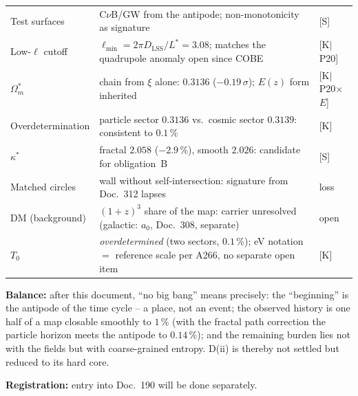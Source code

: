 \documentclass[11pt]{report}
\begin{document}
{\begin{longtable}{lp{6.4cm}l}
Test surfaces & C$\nu$B/GW from the antipode; non-monotonicity as
  signature & [S] \\
Low-$\ell$ cutoff & $\ell_\text{min} = 2\pi D_\text{LSS}/L^{*} =
  3.08$; matches the quadrupole anomaly open since COBE
  & [K$|$P20] \\
$\Omega_m^{*}$ & chain from $\xi$ alone: $0.3136$
  ($-0.19\,\sigma$); $E(z)$ form inherited & [K$|$P20$\times$$E$] \\
Overdetermination & particle sector $0.3136$ vs.\ cosmic sector
  $0.3139$: consistent to $0.1\,\%$ & [K] \\
$\kappa^{*}$ & fractal $2.058$ ($-2.9\,\%$), smooth $2.026$:
  candidate for obligation~B & [S] \\
Matched circles & wall without self-intersection: signature from
  Doc.~312 lapses & loss \\
DM (background) & $(1{+}z)^3$ share of the map: carrier
  unresolved (galactic: $a_0$, Doc.~308, separate) & open \\
$T_0$ & \emph{overdetermined} (two sectors, $0.1\,\%$); eV notation
  $=$ reference scale per A266, no separate open item & [K] \\
\end{longtable}
}

\medskip
\noindent\textbf{Balance:} after this document, \enquote{no big
bang} means precisely: the \enquote{beginning} is the antipode of
the time cycle -- a place, not an event; the observed history is
one half of a map closable smoothly to $1\,\%$ (with the fractal
path correction the particle horizon meets the antipode to
$0.14\,\%$); and the remaining
burden lies not with the fields but with coarse-grained entropy.
D(ii) is thereby not settled but reduced to its hard core.

\medskip
\noindent\textbf{Registration:} entry into Doc.~190 will be done
separately.
\end{document}
